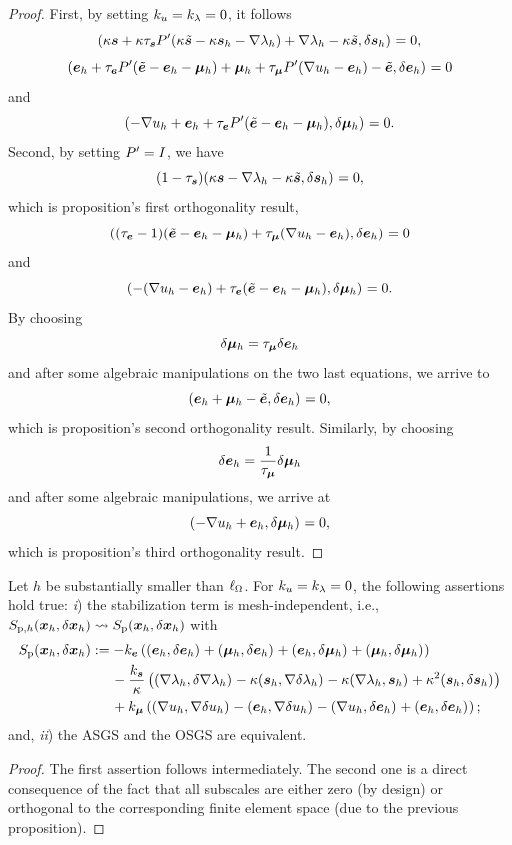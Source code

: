 \begin{proof}
First, by setting $\ku = \kl = 0$, it follows
$$\iprod[]{\kappa\sF+\kappa\ts\Pt(\kappa\sFt-\kappa\sFh-\nabla\lFh)+ \nabla\lFh-\kappa\sFt}{\delta\sFh} = 0,$$
%
$$\iprod[]{\eFh+\te\Pt(\eFt-\eFh-\mFh)+\mFh+\tm\Pt(\nabla\uFh-\eFh)-\eFt}{\delta\eFh} = 0$$
and
$$\iprod[]{-\nabla\uFh+\eFh+\te\Pt(\eFt-\eFh-\mFh)}{\delta\mFh} = 0.$$
%
Second, by setting $\Pt = I$, we have
$$(1-\ts)\iprod[]{\kappa\sF-\nabla\lFh-\kappa\sFt}{\delta\sFh} = 0,$$
which is proposition's first orthogonality result,%
$$\iprod[]{(\te-1)(\eFt-\eFh-\mFh)+\tm(\nabla\uFh-\eFh)}{\delta\eFh} = 0$$
%
and
%
$$\iprod[]{-(\nabla\uFh-\eFh)+\te(\eFt-\eFh-\mFh)}{\delta\mFh} = 0.$$
By choosing
$$\delta\mFh = \tm\delta\eFh$$
and after some algebraic manipulations on the two last equations, we arrive to
%
$$\iprod[]{\eFh+\mFh-\eFt}{\delta\eFh} = 0,$$
which is proposition's second orthogonality result.
Similarly, by choosing
$$\delta\eFh = \frac{1}{\tm}\delta\mFh$$
and after some algebraic manipulations, we arrive at
$$\iprod[]{-\nabla\uFh+\eFh}{\delta\mFh} = 0,$$
which is proposition's third orthogonality result.%
\end{proof}

\begin{proposition}
Let $h$ be substantially smaller than $\length$. For $\ku=\kl=0$, the following assertions hold true: \textit{i}) the stabilization term is mesh-independent, i.e., $\Sph(\xFh,\delta\xFh)\leadsto\Sp(\xFh,\delta\xFh)$ with
\begin{align*}
\Sp(\xFh,\delta\xFh)
&:=-\ke\left(\iprod[]{\eFh}{\delta\eFh}+\iprod[]{\mFh}{\delta\eFh}+\iprod[]{\eFh}{\delta \mFh}+\iprod[]{\mFh}{\delta\mFh}\right)\\
&\quad\:\:-\frac{\ks}{\kappa}\left(\iprod[]{\nabla\lFh}{\delta\nabla\lFh}-\kappa\iprod[]{\sFh}{\nabla\delta\lFh}-\kappa\iprod[]{\nabla\lFh}{\sFh}+\kappa^2\iprod[]{\sFh}{\delta\sFh}\right)\\
&\quad\:\:+\km\left(\iprod[]{\nabla\uFh}{\nabla\delta\uFh}-
\iprod[]{\eFh}{\nabla\delta\uFh}-\iprod[]{\nabla\uFh}{\delta\eFh}+\iprod[]{\eFh}{\delta\eFh}\right); 
\end{align*}
and, \textit{ii}) the ASGS and the OSGS are equivalent.
\end{proposition}
\begin{proof}
    The first assertion follows intermediately. The second one is a direct consequence of the fact that all subscales
    are either zero (by design) or orthogonal to the corresponding finite element space (due to the previous proposition).
\end{proof}

